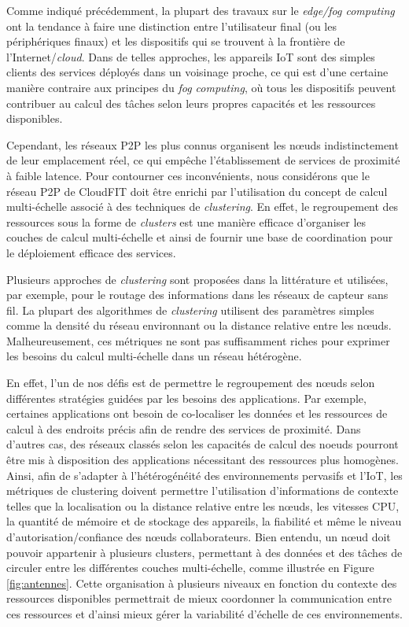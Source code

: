 Comme indiqué précédemment, la plupart des travaux sur le \textit{edge/fog computing} ont la tendance à faire une distinction entre l'utilisateur final (ou les périphériques finaux) et les dispositifs qui se trouvent à la frontière de l'Internet/\textit{cloud}. Dans de telles approches, les appareils IoT sont des simples clients des services déployés dans un voisinage proche, ce qui est d'une certaine manière contraire aux principes du \textit{fog computing}, où tous les dispositifs peuvent contribuer au calcul des tâches selon leurs propres capacités et les ressources disponibles. 

Cependant, les réseaux P2P les plus connus organisent les n{\oe}uds indistinctement de leur emplacement réel, ce qui empêche l'établissement de services de proximité à faible latence. Pour contourner ces inconvénients, nous considérons que le réseau P2P de CloudFIT doit être enrichi par l'utilisation du concept de calcul multi-échelle \cite{Rottenberg2012,Rottenberg2014}  associé à des techniques de \textit{clustering}. En effet, le regroupement des ressources sous la forme de \textit{clusters} est une manière efficace d'organiser les couches de calcul multi-échelle et ainsi de fournir une base de coordination pour le déploiement efficace des services.

Plusieurs approches de \textit{clustering} sont proposées dans la littérature \cite{Johnen2011} et utilisées, par exemple, pour  le routage des informations dans les réseaux de capteur sans fil. La plupart des algorithmes de \textit{clustering} utilisent des paramètres simples comme la densité du réseau environnant ou la distance relative entre les n{\oe}uds. Malheureusement, ces métriques ne sont pas suffisamment riches pour exprimer les besoins du calcul multi-échelle dans un réseau hétérogène. 

En effet, l'un de nos défis est de permettre le regroupement des n{\oe}uds selon différentes stratégies guidées par les besoins des applications. Par exemple, certaines applications ont besoin de co-localiser les données et les ressources de calcul à des endroits précis afin de rendre des services de proximité. Dans d'autres cas, des réseaux classés selon les capacités de calcul des n{oe}uds pourront être mis à disposition des applications nécessitant des ressources plus homogènes. Ainsi, afin de s'adapter à l'hétérogénéité des environnements pervasifs et l'IoT, les métriques de clustering doivent permettre l'utilisation d'informations de contexte telles que la localisation ou la distance relative entre les n{\oe}uds, les vitesses CPU, la quantité de mémoire et de stockage des appareils, la fiabilité et même le niveau d'autorisation/confiance des n{\oe}uds collaborateurs. Bien entendu, un n{\oe}ud doit pouvoir appartenir à plusieurs clusters, permettant à des données et des tâches de circuler entre les différentes couches multi-échelle, comme illustrée en Figure \ref{fig:antennes}. Cette organisation à plusieurs niveaux en fonction du contexte des ressources disponibles permettrait de mieux coordonner la communication entre ces ressources et d'ainsi mieux gérer la variabilité d'échelle de ces environnements. 



